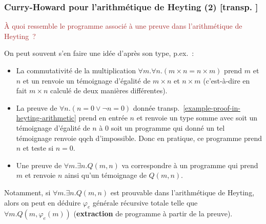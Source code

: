 \documentclass[mathserif,a4paper,aspectratio=169]{beamer}
\newcommand{\itempoint}{\strut\hbox{\color{beamerstructure}\donotcoloroutermaths$\blacktriangleright$}\nobreak\hskip.5em plus.5em\relax}
\newcommand{\cps}{\mathrm{CPS}}
\newcommand{\donotcoloroutermaths}{\relax}
\renewcommand{\frametitle}[1]{\subsubsection*{#1 {\footnotesize[transp. \insertframenumber]}}}
\newcommand{\myitemmark}{\hbox{$\blacktriangleright$}}
\renewcommand{\itempoint}{\strut\myitemmark\nobreak\hskip.5em plus.5em\relax}
\begin{document}
\begin{frame}
\frametitle{Curry-Howard pour l'arithmétique de Heyting (2)}

\textcolor{brown}{À quoi ressemble le programme associé à une preuve
  dans l'arithmétique de Heyting ?}

\medskip

On peut souvent s'en faire une idée d'après son type, p.ex. :
\begin{itemize}
\item La commutativité de la multiplication $\forall m.\forall
  n.(m\times n = n\times m)$ prend $m$ et $n$ et un renvoie un
  témoignage d'égalité de $m\times n$ et $n\times m$ (c'est-à-dire en
  fait $m\times n$ calculé de deux manières différentes).
\item La preuve de $\forall n. (n=0 \lor \neg n=0)$ donnée
  transp. \ref{example-proof-in-heyting-arithmetic} prend en entrée
  $n$ et renvoie un type somme avec soit un témoignage d'égalité de
  $n$ à $0$ soit un programme qui donné un tel témoignage renvoie qqch
  d'impossible.  Donc en pratique, ce programme prend $n$ et teste si
  $n=0$.
\item Une preuve de $\forall m.\exists n. Q(m,n)$ va correspondre à un
  programme qui prend $m$ et renvoie $n$ ainsi qu'un témoignage de
  $Q(m,n)$.
\end{itemize}

\medskip

Notamment, \alert{si} $\forall m.\exists n. Q(m,n)$ est prouvable dans
l'arithmétique de \alert{Heyting}, \alert{alors} on peut en déduire
$\varphi_e$ générale récursive totale telle que $\forall
m. Q(m,\varphi_e(m))$ (\textbf{extraction} de programme à partir de la
preuve).

\end{frame}
%
\end{document}
